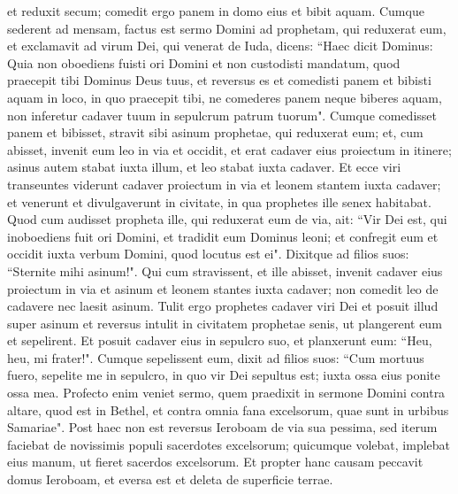 \begin{biblechapter}
\verse et reduxit secum; comedit ergo panem in domo eius et bibit aquam. 
\verse Cumque sederent ad mensam, factus est sermo Domini ad prophetam, qui reduxerat eum, 
\verse et exclamavit ad virum Dei, qui venerat de Iuda, dicens: “Haec dicit Dominus: Quia non oboediens fuisti ori Domini et non custodisti mandatum, quod praecepit tibi Dominus Deus tuus, 
\verse et reversus es et comedisti panem et bibisti aquam in loco, in quo praecepit tibi, ne comederes panem neque biberes aquam, non inferetur cadaver tuum in sepulcrum patrum tuorum". 
\verse Cumque comedisset panem et bibisset, stravit sibi asinum prophetae, qui reduxerat eum; 
\verse et, cum abisset, invenit eum leo in via et occidit, et erat cadaver eius proiectum in itinere; asinus autem stabat iuxta illum, et leo stabat iuxta cadaver. 
\verse Et ecce viri transeuntes viderunt cadaver proiectum in via et leonem stantem iuxta cadaver; et venerunt et divulgaverunt in civitate, in qua prophetes ille senex habitabat. 
\verse Quod cum audisset propheta ille, qui reduxerat eum de via, ait: “Vir Dei est, qui inoboediens fuit ori Domini, et tradidit eum Dominus leoni; et confregit eum et occidit iuxta verbum Domini, quod locutus est ei". 
\verse Dixitque ad filios suos: “Sternite mihi asinum!". Qui cum stravissent, 
\verse et ille abisset, invenit cadaver eius proiectum in via et asinum et leonem stantes iuxta cadaver; non comedit leo de cadavere nec laesit asinum. 
\verse Tulit ergo prophetes cadaver viri Dei et posuit illud super asinum et reversus intulit in civitatem prophetae senis, ut plangerent eum et sepelirent. 
\verse Et posuit cadaver eius in sepulcro suo, et planxerunt eum: “Heu, heu, mi frater!". 
\verse Cumque sepelissent eum, dixit ad filios suos: “Cum mortuus fuero, sepelite me in sepulcro, in quo vir Dei sepultus est; iuxta ossa eius ponite ossa mea. 
\verse Profecto enim veniet sermo, quem praedixit in sermone Domini contra altare, quod est in Bethel, et contra omnia fana excelsorum, quae sunt in urbibus Samariae". 
\verse Post haec non est reversus Ieroboam de via sua pessima, sed iterum faciebat de novissimis populi sacerdotes excelsorum; quicumque volebat, implebat eius manum, ut fieret sacerdos excelsorum. 
\verse Et propter hanc causam peccavit domus Ieroboam, et eversa est et deleta de superficie terrae. 
\end{biblechapter}

